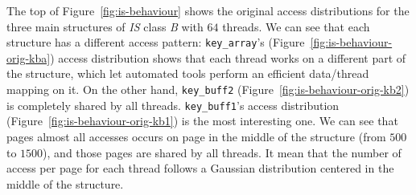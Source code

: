 \begin{figure*}[htb]
    \centering


    \caption{Memory access distribution for the main structures of
        \emph{IS}. Original behavior on the top, modified on
    the bottom.}
    \label{fig:is-behaviour}

\end{figure*}

The top of Figure~\ref{fig:is-behaviour} shows the original access distributions for the
three main structures of \emph{IS} class \emph{B} with $64$ threads. We can see that
each structure has a different access pattern: \texttt{key\_array}'s
(Figure~\ref{fig:is-behaviour-orig-kba}) access distribution shows that each
thread works on a different part of the structure, which let automated
tools perform an efficient data/thread mapping on it. On the other hand, \texttt{key\_buff2}
(Figure~\ref{fig:is-behaviour-orig-kb2}) is completely shared by all threads.
\texttt{key\_buff1}'s access distribution (Figure~\ref{fig:is-behaviour-orig-kb1})
is the most interesting one. We can see that pages almost all accesses occurs
on page in the middle of the structure (from $500$ to $1500$), and those pages
are shared by all threads. It mean that the number of access per page  for
each thread follows a Gaussian distribution centered in the middle of the
structure.

%

